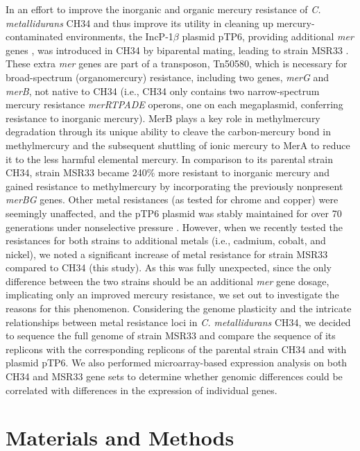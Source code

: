In an effort to improve the inorganic and organic mercury resistance of \textit{C. metallidurans} CH34 and thus improve its utility in cleaning up mercury-contaminated environments, the IncP-1$\beta$ plasmid pTP6, providing additional \textit{mer} genes \citep{smalla2006increased}, was introduced in CH34 by biparental mating, leading to strain MSR33 \citep{rojas2011characterization}. These extra \textit{mer} genes are part of a transposon, Tn50580, which is necessary for broad-spectrum (organomercury) resistance, including two genes, \textit{merG} and \textit{merB}, not native to CH34 (i.e., CH34 only contains two narrow-spectrum mercury resistance \textit{merRTPADE} operons, one on each megaplasmid, conferring resistance to inorganic mercury). MerB plays a key role in methylmercury degradation through its unique ability to cleave the carbon-mercury bond in methylmercury and the subsequent shuttling of ionic mercury to MerA to reduce it to the less harmful elemental mercury.
In comparison to its parental strain CH34, strain MSR33 became 240\% more resistant to inorganic mercury and gained resistance to methylmercury by incorporating the previously nonpresent \textit{merBG} genes. Other metal resistances (as tested for chrome and copper) were seemingly unaffected, and the pTP6 plasmid was stably maintained for over 70 generations under nonselective pressure \citep{rojas2011characterization}. However, when we recently tested the resistances for both strains to additional metals (i.e., cadmium, cobalt, and nickel), we noted a significant increase of metal resistance for strain MSR33 compared to CH34 (this study). As this was fully unexpected, since the only difference between the two strains should be an additional \textit{mer} gene dosage, implicating only an improved mercury resistance, we set out to investigate the reasons for this phenomenon. Considering the genome plasticity \citep{van2009new,mijnendonckx2011insertion,van2012variation} and the intricate relationships between metal resistance loci \citep{monsieurs2011heavy} in \textit{C. metallidurans} CH34, we decided to sequence the full genome of strain MSR33 and compare the sequence of its replicons with the corresponding replicons of the parental strain CH34 and with plasmid pTP6. We also performed microarray-based expression analysis on both CH34 and MSR33 gene sets to determine whether genomic differences could be correlated with differences in the expression of individual genes.

\section{Materials and Methods}

